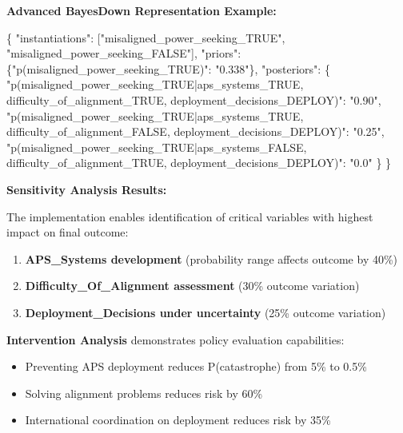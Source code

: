 \documentclass[
  11pt,
  letterpaper,
]{book}
\newenvironment{Shaded}{\begin{snugshade}}{\end{snugshade}}
\newcommand{\DataTypeTok}[1]{\textcolor[rgb]{0.68,0.00,0.00}{#1}}
\newcommand{\FunctionTok}[1]{\textcolor[rgb]{0.28,0.35,0.67}{#1}}
\newcommand{\OtherTok}[1]{\textcolor[rgb]{0.00,0.23,0.31}{#1}}
\newcommand{\StringTok}[1]{\textcolor[rgb]{0.13,0.47,0.30}{#1}}
\providecommand{\tightlist}{%
  \setlength{\itemsep}{0pt}\setlength{\parskip}{0pt}}
\begin{document}
\textbf{Advanced BayesDown Representation Example:}

\begin{Shaded}
\begin{Highlighting}[]
\FunctionTok{\{}
  \DataTypeTok{"instantiations"}\FunctionTok{:} \OtherTok{[}\StringTok{"misaligned\_power\_seeking\_TRUE"}\OtherTok{,} \StringTok{"misaligned\_power\_seeking\_FALSE"}\OtherTok{]}\FunctionTok{,}
  \DataTypeTok{"priors"}\FunctionTok{:} \FunctionTok{\{}\DataTypeTok{"p(misaligned\_power\_seeking\_TRUE)"}\FunctionTok{:} \StringTok{"0.338"}\FunctionTok{\},}
  \DataTypeTok{"posteriors"}\FunctionTok{:} \FunctionTok{\{}
    \DataTypeTok{"p(misaligned\_power\_seeking\_TRUE|aps\_systems\_TRUE, difficulty\_of\_alignment\_TRUE, deployment\_decisions\_DEPLOY)"}\FunctionTok{:} \StringTok{"0.90"}\FunctionTok{,}
    \DataTypeTok{"p(misaligned\_power\_seeking\_TRUE|aps\_systems\_TRUE, difficulty\_of\_alignment\_FALSE, deployment\_decisions\_DEPLOY)"}\FunctionTok{:} \StringTok{"0.25"}\FunctionTok{,}
    \DataTypeTok{"p(misaligned\_power\_seeking\_TRUE|aps\_systems\_FALSE, difficulty\_of\_alignment\_TRUE, deployment\_decisions\_DEPLOY)"}\FunctionTok{:} \StringTok{"0.0"}
  \FunctionTok{\}}
\FunctionTok{\}}
\end{Highlighting}
\end{Shaded}

\textbf{Sensitivity Analysis Results:}

The implementation enables identification of critical variables with
highest impact on final outcome:

\begin{enumerate}
\def\labelenumi{\arabic{enumi}.}
\tightlist
\item
  \textbf{APS\_Systems development} (probability range affects outcome
  by 40\%)
\item
  \textbf{Difficulty\_Of\_Alignment assessment} (30\% outcome variation)
\item
  \textbf{Deployment\_Decisions under uncertainty} (25\% outcome
  variation)
\end{enumerate}

\textbf{Intervention Analysis} demonstrates policy evaluation
capabilities:

\begin{itemize}
\tightlist
\item
  Preventing APS deployment reduces P(catastrophe) from 5\% to 0.5\%
\item
  Solving alignment problems reduces risk by 60\%
\item
  International coordination on deployment reduces risk by 35\%
\end{itemize}
\end{document}
